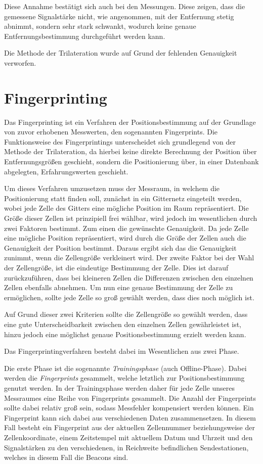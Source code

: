 Diese Annahme bestätigt sich auch bei den Messungen. Diese zeigen, dass die gemessene Signalstärke nicht, wie angenommen, mit der Entfernung stetig abnimmt, sondern sehr stark schwankt, wodurch keine genaue Entfernungsbestimmung durchgeführt werden kann.

Die Methode der Trilateration wurde auf Grund der fehlenden Genauigkeit verworfen. 

\section{Fingerprinting}
\label{sec:implementation:fingerprinting}
Das Fingerprinting ist ein Verfahren der Positionsbestimmung auf der Grundlage von zuvor erhobenen Messwerten, den sogenannten Fingerprints.
Die Funktionsweise des Fingerprintings unterscheidet sich grundlegend von der Methode der Trilateration, da hierbei keine direkte Berechnung der Position über Entfernungsgrößen geschieht, sondern die Positionierung über, in einer Datenbank abgelegten, Erfahrungswerten geschieht.

Um dieses Verfahren umzusetzen muss der Messraum, in welchem die Positionierung statt finden soll, zunächst in ein Gitternetz eingeteilt werden, wobei jede Zelle des Gitters eine mögliche Position im Raum repräsentiert. Die Größe dieser Zellen ist prinzipiell frei wählbar, wird jedoch im wesentlichen durch zwei Faktoren bestimmt. 
Zum einen die gewünschte Genauigkeit. Da jede Zelle eine mögliche Position repräsentiert, wird durch die Größe der Zellen auch die Genauigkeit der Position bestimmt. Daraus ergibt sich das die Genauigkeit zunimmt, wenn die Zellengröße verkleinert wird.
Der zweite Faktor bei der Wahl der Zellengröße, ist die eindeutige Bestimmung der Zelle. Dies ist darauf zurückzuführen, dass bei kleineren Zellen die Differenzen zwischen den einzelnen Zellen ebenfalls abnehmen. Um nun eine genaue Bestimmung der Zelle zu ermöglichen, sollte jede Zelle so groß gewählt werden, dass dies noch möglich ist.

Auf Grund dieser zwei Kriterien sollte die Zellengröße so gewählt werden, dass eine gute Unterscheidbarkeit zwischen den einzelnen Zellen gewährleistet ist, hinzu jedoch eine möglichst genaue Positionsbestimmung erzielt werden kann.


Das Fingerprintingverfahren besteht dabei im Wesentlichen aus zwei Phase.

Die erste Phase ist die sogenannte \emph{Trainingsphase} (auch Offline-Phase). Dabei werden die \emph{Fingerprints} gesammelt, welche letztlich zur Positionsbestimmung genutzt werden. 
In der Trainingsphase werden daher für jede Zelle unseres Messraumes eine Reihe von Fingerprints gesammelt. Die Anzahl der Fingerprints sollte dabei relativ groß sein, sodass Messfehler kompensiert werden können. 
Ein Fingerprint kann sich dabei aus verschiedenen Daten zusammensetzen. 
In diesem Fall besteht ein Fingerprint aus der aktuellen Zellennummer beziehungsweise der Zellenkoordinate, einem Zeitstempel mit aktuellem Datum und Uhrzeit und den Signalstärken zu den verschiedenen, in Reichweite befindlichen Sendestationen, welches in diesem Fall die Beacons sind.


